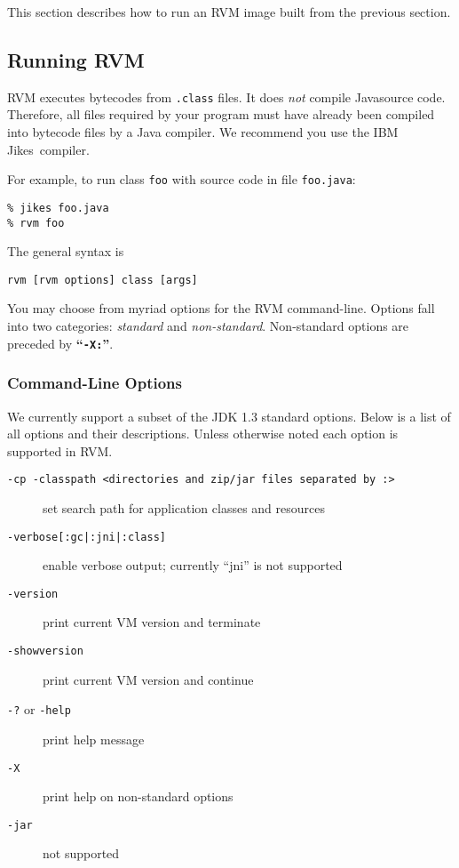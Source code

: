 This section describes how to run an RVM  image built from the previous
section. 

\subsection{Running RVM}

RVM executes bytecodes from {\tt .class} files. It does {\em not} compile
Java\trademark source code. Therefore, all files 
required by your program must have already been compiled into bytecode
files by a Java compiler.  We recommend you use the IBM Jikes\trademark\ compiler.

For example, to run class {\tt foo} with source code in file {\tt foo.java}:
\begin{verbatim}
% jikes foo.java
% rvm foo 
\end{verbatim}

The general syntax is
\begin{verbatim}
rvm [rvm options] class [args]
\end{verbatim}

You may choose from myriad options for the RVM command-line.  
Options fall into two categories: {\em standard} and {\em
non-standard}.  Non-standard options are preceded by {\bf ``{\tt -X:}''}.

\subsubsection{Command-Line Options}

We currently support a subset of the JDK 1.3 standard options.  Below
is a list of all options and their descriptions.  Unless otherwise noted each
option is supported in RVM.
\begin{description}
\item[{\tt -cp -classpath <directories and zip/jar files separated by :>}]
set search path for application classes and resources

\item[{\tt -verbose[:gc|:jni|:class]}]
enable verbose output; currently ``jni'' is not supported

\item[{\tt -version}] print current VM version and terminate

\item[{\tt -showversion}] print current VM version and continue

\item[{\tt -?} or {\tt -help}] print help message

\item[{\tt -X}] print help on non-standard options

\item[{\tt -jar}] not supported

\end{description}

